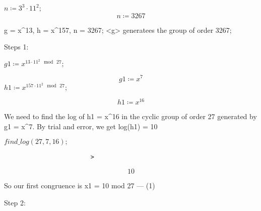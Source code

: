 \documentclass[11pt,a4paper,fleqn]{article}
\begin{document}
\begin{enumerate}[1.]
\begin{flushleft}
\begin{enumerate}
\begin{mdframed}
					{$ \displaystyle n \coloneqq 3^{3}\cdot 11^{2}; $}
					{$ \displaystyle \, $}%
					\begin{dmath}\label{(2)}
						n \coloneqq 3267
					\end{dmath}
					\begin{Maple Normal}
						g = x^13, h = x^157, n = 3267; <g> generatees the group of order 3267;
						
						
						Steps 1:
						
						
					\end{Maple Normal}
					\mapleinput
					{$ \displaystyle \mathit{g1} \coloneqq x^{13\cdot 11^{2}\mod \,27}; $}
					
					\begin{dmath}\label{(3)}
						\mathit{g1} \coloneqq x^{7}
					\end{dmath}
					\mapleinput
					{$ \displaystyle \mathit{h1} \coloneqq x^{157\cdot 11^{2}\mod \,27}; $}
					
					\begin{dmath}\label{(4)}
						\mathit{h1} \coloneqq x^{16}
					\end{dmath}
					\begin{Maple Normal}
						We need to find the log of h1 = x^16 in the cyclic group of order 27 generated by g1 = x^7. By trial and error, we get log(h1) = 10
					\end{Maple Normal}
					\begin{Maple Normal}
						
					\end{Maple Normal}
					
					{$ \displaystyle \textit{find\_log} (27,7,16); $}\begin{lstlisting}
						> 
					\end{lstlisting}
					\begin{dmath}\label{(5)}
						10
					\end{dmath}
					\begin{Maple Normal}
						So our first congruence is x1 = 10 mod 27 --- (1)
					\end{Maple Normal}
					\begin{Maple Normal}
						
					\end{Maple Normal}
					\begin{Maple Normal}
						Step 2:
					\end{Maple Normal}
					\begin{Maple Normal}
						

\end{Maple Normal}
\end{mdframed}
\end{enumerate}
\end{flushleft}
\end{enumerate}
\end{document}
